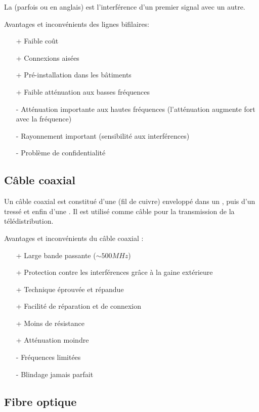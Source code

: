 La  (parfois  ou  en anglais) est l'interférence d'un premier signal avec un autre.

Avantages et inconvénients des lignes bifilaires:
\begin{itemize}
	\item[+] Faible coût
	\item[+] Connexions aisées
	\item[+] Pré-installation dans les bâtiments
	\item[+] Faible atténuation aux basses fréquences
	\item[-] Atténuation importante aux hautes fréquences (l'atténuation augmente fort avec la fréquence)
	\item[-] Rayonnement important (sensibilité aux interférences)
	\item[-] Problème de confidentialité
\end{itemize}

\subsection{Câble coaxial}

Un câble coaxial est constitué d'une  (fil de cuivre) enveloppé dans un , puis d'un  tressé et enfin d'une . Il est utilisé comme câble pour la transmission de la télédistribution.

Avantages et inconvénients du câble coaxial :
\begin{itemize}
	\item[+] Large bande passante ($\sim 500 MHz$)
	\item[+] Protection contre les interférences grâce à la gaine extérieure
	\item[+] Technique éprouvée et répandue
	\item[+] Facilité de réparation et de connexion
	\item[+] Moins de résistance
	\item[+] Atténuation moindre
	\item[-] Fréquences limitées
	\item[-] Blindage jamais parfait
\end{itemize}

\subsection{Fibre optique}

